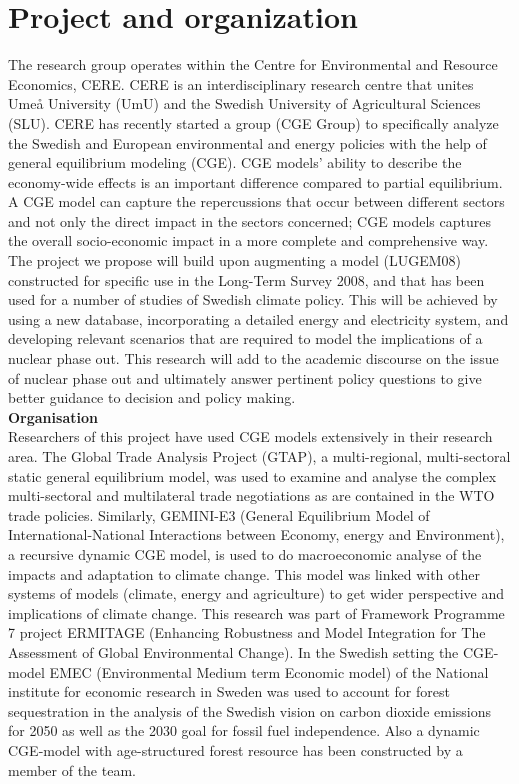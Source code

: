 \section{Project and organization}
The research group operates within the Centre for Environmental and Resource Economics, CERE. CERE is an interdisciplinary research centre that unites Umeå University (UmU) and the Swedish University of Agricultural Sciences (SLU). CERE has recently started a group (CGE Group) to specifically analyze the Swedish and European environmental and energy policies with the help of general equilibrium modeling (CGE). CGE models' ability to describe the economy-wide effects is an important difference compared to partial equilibrium. A CGE model can capture the repercussions that occur between different sectors and not only the direct impact in the sectors concerned; CGE models captures the overall socio-economic impact in a more complete and comprehensive way. The project we propose will build upon augmenting a model (LUGEM08) constructed for specific use in the Long-Term Survey 2008, and that has been used for a number of studies of Swedish climate policy. This will be achieved by using a new database, incorporating a detailed energy and electricity system, and developing relevant scenarios that are required to model the implications of a nuclear phase out. This research will add to the academic discourse on the issue of nuclear phase out and ultimately answer pertinent policy questions to give better guidance to decision and policy making.\\

\textbf{Organisation}\\
Researchers of this project have used CGE models extensively in their research area. The Global Trade Analysis Project (GTAP), a multi-regional, multi-sectoral static general equilibrium model, was used to examine and analyse the complex multi-sectoral and multilateral trade negotiations as are contained in the WTO trade policies. Similarly, GEMINI-E3 (General Equilibrium Model of International-National Interactions between Economy, energy and Environment), a recursive dynamic CGE model, is used to do macroeconomic analyse of the impacts and adaptation to climate change. This model was linked with other systems of models (climate, energy and agriculture) to get wider perspective and implications of climate change. This research was part of Framework Programme 7 project ERMITAGE (Enhancing Robustness and Model Integration for The Assessment of Global Environmental Change). In the Swedish setting the CGE-model EMEC (Environmental Medium term Economic model) of the National institute for economic research in Sweden was used to account for forest sequestration in the analysis of the Swedish vision on carbon dioxide emissions for 2050 as well as the 2030 goal for fossil fuel independence. Also a dynamic CGE-model with age-structured forest resource \citep{furtenback2011three} has been constructed by a member of the team.\\

